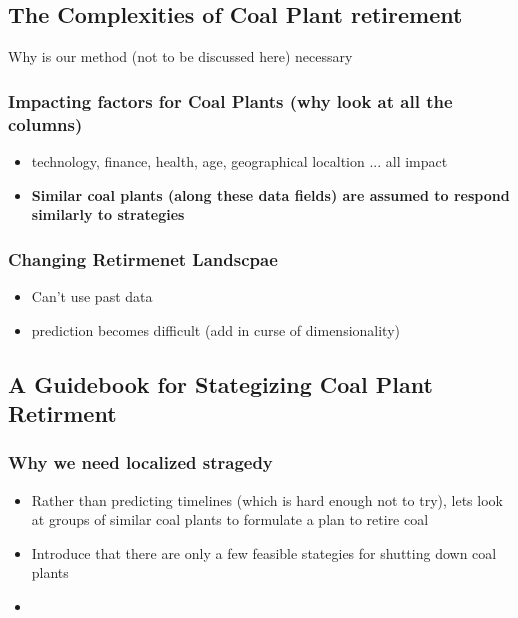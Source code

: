 \documentclass{article}
\begin{document}
\subsection{The Complexities of Coal Plant retirement}
Why is our method (not to be discussed here) necessary 
\subsubsection{Impacting factors for Coal Plants (why look at all the columns)}
\begin{itemize}
    \item technology, finance, health, age, geographical localtion ... all impact 
    \item \textbf{Similar coal plants (along these data fields) are assumed to respond similarly to strategies}
\end{itemize}
\subsubsection{Changing Retirmenet Landscpae}
\begin{itemize}
    \item Can't use past data 
    \item prediction becomes difficult (add in curse of dimensionality)
\end{itemize}
\subsection{A Guidebook for Stategizing Coal Plant Retirment}

\subsubsection{Why we need localized stragedy}
\begin{itemize}
    \item Rather than predicting timelines (which is hard enough not to try), lets look at groups of similar coal plants to formulate a plan to retire coal
    \item Introduce that there are only a few feasible stategies for shutting down coal plants
    \item  
\end{itemize}
\end{document}
